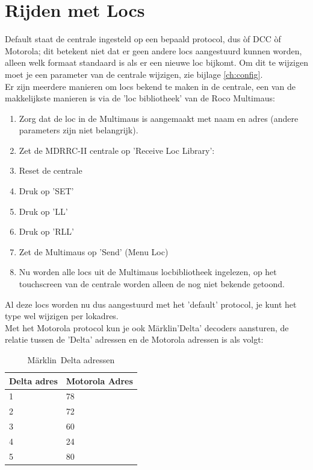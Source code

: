 \documentclass[12pt,a4paper]{report}
\newcommand*{\marklin}{M\"{a}rklin}
\begin{document}
\section{Rijden met Locs}
Default staat de centrale ingesteld op een bepaald protocol, dus \`{o}f DCC \`{o}f Motorola; dit betekent niet dat er geen andere locs aangestuurd kunnen worden, alleen welk formaat standaard is als er een nieuwe loc bijkomt. Om dit te wijzigen moet je een parameter van de centrale wijzigen, zie bijlage \ref{ch:config}.\\
Er zijn meerdere manieren om locs bekend te maken in de centrale, een van de makkelijkste manieren is via de 'loc bibliotheek' van de Roco Multimaus:
\begin{enumerate}
\item Zorg dat de loc in de Multimaus is aangemaakt met naam en adres (andere parameters zijn niet belangrijk).
\item Zet de MDRRC-II centrale op 'Receive Loc Library': 
\item Reset de centrale
\item Druk op 'SET'
\item Druk op 'LL'
\item Druk op 'RLL'
\item Zet de Multimaus op 'Send' (Menu Loc)
\item Nu worden alle locs uit de Multimaus locbibliotheek ingelezen, op het touchscreen van de centrale worden alleen de nog niet bekende getoond.
\end{enumerate}

Al deze locs worden nu dus aangestuurd met het 'default' protocol, je kunt het type wel wijzigen per lokadres.\\
Met het Motorola protocol kun je ook \marklin 'Delta' decoders aansturen, de relatie tussen de 'Delta' adressen en de Motorola adressen is als volgt:\\

\begin{table}[h!]
\begin{tabular}{|l|l|}
\hline
Delta adres&Motorola Adres\\
\hline
1&78\\
\hline
2&72\\
\hline
3&60\\
\hline
4&24\\
\hline
5&80\\
\hline
\end{tabular}
\caption{\marklin \ Delta adressen}
\end{table}
\end{document}
